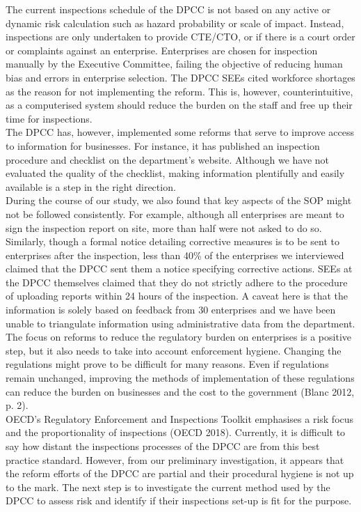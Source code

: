 \documentclass[a4paper, 12pt]{article}
\begin{document}
	The current inspections schedule of the DPCC is not based on any active or dynamic risk calculation such as hazard probability or scale of impact. Instead, inspections are only undertaken to provide CTE/CTO, or if there is a court order or complaints against an enterprise. Enterprises are chosen for inspection manually by the Executive Committee, failing the objective of reducing human bias and errors in enterprise selection. The DPCC SEEs cited workforce shortages as the reason for not implementing the reform. This is, however, counterintuitive, as a computerised system should reduce the burden on the staff and free up their time for inspections. \\
	
	The DPCC has, however, implemented some reforms that serve to improve access to information for businesses. For instance, it has published an inspection procedure and checklist on the department’s website. Although we have not evaluated the quality of the checklist, making information plentifully and easily available is a step in the right direction. \\
	
	During the course of our study, we also found that key aspects of the SOP might not be followed consistently. For example, although all enterprises are meant to sign the inspection report on site, more than half were not asked to do so. Similarly, though a formal notice detailing corrective measures is to be sent to enterprises after the inspection, less than 40\% of the enterprises we interviewed claimed that the DPCC sent them a notice specifying corrective actions. SEEs at the DPCC themselves claimed that they do not strictly adhere to the procedure of uploading reports within 24 hours of the inspection. A caveat here is that the information is solely based on feedback from 30 enterprises and we have been unable to triangulate information using administrative data from the department. \\
	
	The focus on reforms to reduce the regulatory burden on enterprises is a positive step, but it also needs to take into account enforcement hygiene. Changing the regulations might prove to be difficult for many reasons. Even if regulations remain unchanged, improving the methods of implementation of these regulations can reduce the burden on businesses and the cost to the government (Blanc 2012, p. 2). \\
	
	OECD’s Regulatory Enforcement and Inspections Toolkit emphasises a risk focus and the proportionality of inspections (OECD 2018). Currently, it is difficult to say how distant the inspections processes of the DPCC are from this best practice standard. However, from our preliminary investigation, it appears that the reform efforts of the DPCC are partial and their procedural hygiene is not up to the mark. The next step is to investigate the current method used by the DPCC to assess risk and identify if their inspections set-up is fit for the purpose. \\
	
\end{document}
